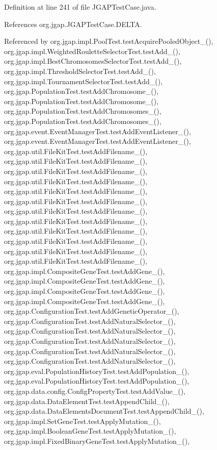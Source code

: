 Definition at line 241 of file J\-G\-A\-P\-Test\-Case.\-java.



References org.\-jgap.\-J\-G\-A\-P\-Test\-Case.\-D\-E\-L\-T\-A.



Referenced by org.\-jgap.\-impl.\-Pool\-Test.\-test\-Acquire\-Pooled\-Object\-\_(), org.\-jgap.\-impl.\-Weighted\-Roulette\-Selector\-Test.\-test\-Add\-\_(), org.\-jgap.\-impl.\-Best\-Chromosomes\-Selector\-Test.\-test\-Add\-\_(), org.\-jgap.\-impl.\-Threshold\-Selector\-Test.\-test\-Add\-\_(), org.\-jgap.\-impl.\-Tournament\-Selector\-Test.\-test\-Add\-\_(), org.\-jgap.\-Population\-Test.\-test\-Add\-Chromosome\-\_(), org.\-jgap.\-Population\-Test.\-test\-Add\-Chromosome\-\_(), org.\-jgap.\-Population\-Test.\-test\-Add\-Chromosomes\-\_(), org.\-jgap.\-Population\-Test.\-test\-Add\-Chromosomes\-\_(), org.\-jgap.\-event.\-Event\-Manager\-Test.\-test\-Add\-Event\-Listener\-\_(), org.\-jgap.\-event.\-Event\-Manager\-Test.\-test\-Add\-Event\-Listener\-\_(), org.\-jgap.\-util.\-File\-Kit\-Test.\-test\-Add\-Filename\-\_(), org.\-jgap.\-util.\-File\-Kit\-Test.\-test\-Add\-Filename\-\_(), org.\-jgap.\-util.\-File\-Kit\-Test.\-test\-Add\-Filename\-\_(), org.\-jgap.\-util.\-File\-Kit\-Test.\-test\-Add\-Filename\-\_(), org.\-jgap.\-util.\-File\-Kit\-Test.\-test\-Add\-Filename\-\_(), org.\-jgap.\-util.\-File\-Kit\-Test.\-test\-Add\-Filename\-\_(), org.\-jgap.\-util.\-File\-Kit\-Test.\-test\-Add\-Filename\-\_(), org.\-jgap.\-util.\-File\-Kit\-Test.\-test\-Add\-Filename\-\_(), org.\-jgap.\-util.\-File\-Kit\-Test.\-test\-Add\-Filename\-\_(), org.\-jgap.\-util.\-File\-Kit\-Test.\-test\-Add\-Filename\-\_(), org.\-jgap.\-util.\-File\-Kit\-Test.\-test\-Add\-Filename\-\_(), org.\-jgap.\-util.\-File\-Kit\-Test.\-test\-Add\-Filename\-\_(), org.\-jgap.\-impl.\-Composite\-Gene\-Test.\-test\-Add\-Gene\-\_(), org.\-jgap.\-impl.\-Composite\-Gene\-Test.\-test\-Add\-Gene\-\_(), org.\-jgap.\-impl.\-Composite\-Gene\-Test.\-test\-Add\-Gene\-\_(), org.\-jgap.\-impl.\-Composite\-Gene\-Test.\-test\-Add\-Gene\-\_(), org.\-jgap.\-Configuration\-Test.\-test\-Add\-Genetic\-Operator\-\_(), org.\-jgap.\-Configuration\-Test.\-test\-Add\-Natural\-Selector\-\_(), org.\-jgap.\-Configuration\-Test.\-test\-Add\-Natural\-Selector\-\_(), org.\-jgap.\-Configuration\-Test.\-test\-Add\-Natural\-Selector\-\_(), org.\-jgap.\-Configuration\-Test.\-test\-Add\-Natural\-Selector\-\_(), org.\-jgap.\-Configuration\-Test.\-test\-Add\-Natural\-Selector\-\_(), org.\-jgap.\-eval.\-Population\-History\-Test.\-test\-Add\-Population\-\_(), org.\-jgap.\-eval.\-Population\-History\-Test.\-test\-Add\-Population\-\_(), org.\-jgap.\-data.\-config.\-Config\-Property\-Test.\-test\-Add\-Value\-\_(), org.\-jgap.\-data.\-Data\-Element\-Test.\-test\-Append\-Child\-\_(), org.\-jgap.\-data.\-Data\-Elements\-Document\-Test.\-test\-Append\-Child\-\_(), org.\-jgap.\-impl.\-Set\-Gene\-Test.\-test\-Apply\-Mutation\-\_(), org.\-jgap.\-impl.\-Boolean\-Gene\-Test.\-test\-Apply\-Mutation\-\_(), org.\-jgap.\-impl.\-Fixed\-Binary\-Gene\-Test.\-test\-Apply\-Mutation\-\_(), 
